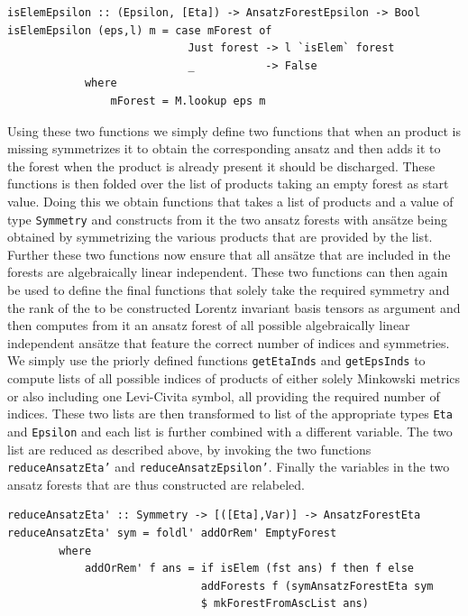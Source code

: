 \documentclass[a4paper,12pt, DIV=14, BCOR=5mm, twoside, headsepline]{scrbook}
\begin{document}
\begin{samepage}
\begin{verbatim}
isElemEpsilon :: (Epsilon, [Eta]) -> AnsatzForestEpsilon -> Bool
isElemEpsilon (eps,l) m = case mForest of
                            Just forest -> l `isElem` forest
                            _           -> False
            where
                mForest = M.lookup eps m  
\end{verbatim} 
\end{samepage}

Using these two functions we simply define two functions that when an product is missing symmetrizes it to obtain the corresponding ansatz and then adds it to the forest when the product is already present it should be discharged. These functions is then folded over the list of products taking an empty forest as start value.  Doing this we obtain functions that takes a list of products and a value of type \texttt{Symmetry} and constructs from it the two ansatz forests with ansätze being obtained by symmetrizing the various products that are provided by the list. Further these two functions now ensure that all ansätze that are included in the forests are algebraically linear independent. 
These two functions can then again be used to define the final functions that solely take the required symmetry and the rank of the to be constructed Lorentz invariant basis tensors as argument and then computes from it an ansatz forest of all possible algebraically linear independent ansätze that feature the correct number of indices and symmetries. We simply use the priorly defined functions \texttt{getEtaInds} and \texttt{getEpsInds} to compute lists of all possible indices of products of either solely Minkowski metrics or also including one Levi-Civita symbol, all providing the required number of indices. These two lists are then transformed to list of the appropriate types \texttt{Eta} and \texttt{Epsilon} and each list is further combined with a different variable. The two list are reduced as described above, by invoking the two functions \texttt{reduceAnsatzEta'} and \texttt{reduceAnsatzEpsilon'}. Finally the variables in the two ansatz forests that are thus constructed are relabeled.

\begin{samepage}
\begin{verbatim}
reduceAnsatzEta' :: Symmetry -> [([Eta],Var)] -> AnsatzForestEta
reduceAnsatzEta' sym = foldl' addOrRem' EmptyForest
        where
            addOrRem' f ans = if isElem (fst ans) f then f else
                              addForests f (symAnsatzForestEta sym 
                              $ mkForestFromAscList ans)
\end{verbatim} 
\end{samepage}
\end{document}
